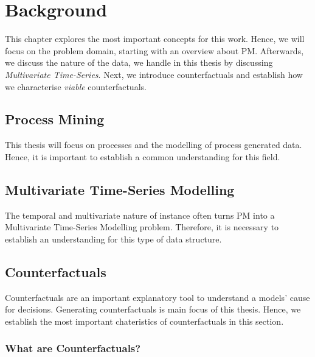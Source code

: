 \documentclass[12pt,a4paper]{report}
\begin{document}
\chapter{Background}
\label{ch:prereq}
This chapter explores the most important concepts for this work. Hence, we will focus on the problem domain, starting with an overview about \Gls{PM}. Afterwards, we discuss the nature of the data, we handle in this thesis by discussing \emph{Multivariate Time-Series}. Next, we introduce counterfactuals and establish how we characterise \emph{viable} counterfactuals. 

\section{Process Mining}
\label{sec:process}
This thesis will focus on processes and the modelling of process generated data. Hence, it is important to establish a common understanding for this field.


\section{Multivariate Time-Series Modelling}
\label{sec:sequences}
The temporal and multivariate nature of \gls{instance} often turns \Gls{PM} into a Multivariate Time-Series Modelling problem. Therefore, it is necessary to establish an understanding for this type of data structure.



\section{Counterfactuals}
\label{sec:counterfactuals}
Counterfactuals are an important explanatory tool to understand a models' cause for decisions. Generating counterfactuals is main focus of this thesis. Hence, we establish the most important chateristics of counterfactuals in this section.

\subsection{What are Counterfactuals?}


% 
\end{document}
